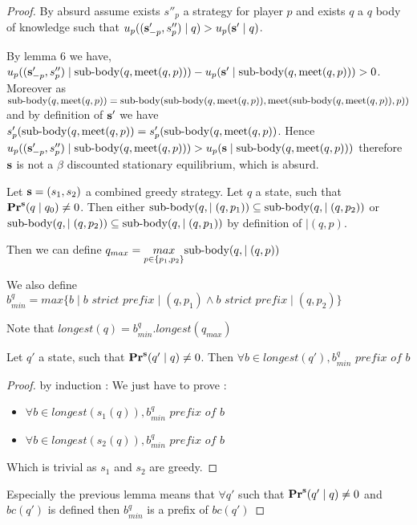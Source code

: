 \begin{proof}
By absurd assume exists $s''_p$ a strategy for player $p$ and exists $q$ a $q$ body of knowledge such that $u_p ((\mathbf{s}'_{-p},s''_p) \mid q) > u_p(\mathbf{s}' \mid q)$.

By lemma 6 we have, $u_p((\mathbf{s}'_{-p},s''_p) \mid {\text{\rm sub-body}}(q,\text{\rm meet}(q,p))) - u_p(\mathbf{s}' \mid {\text{\rm sub-body}}(q,\text{\rm meet}(q,p))) > 0$. 
Moreover as ${\text{\rm sub-body}}(q,\text{\rm meet}(q,p)) = {\text{\rm sub-body}}({\text{\rm sub-body}}(q,\text{\rm meet}(q,p)),\text{\rm meet}({\text{\rm sub-body}}(q,\text{\rm meet}(q,p)),p))$ and by definition of $\mathbf{s}'$ we have $s'_p({\text{\rm sub-body}}(q,\text{\rm meet}(q,p)) = s'_p({\text{\rm sub-body}}(q,\text{\rm meet}(q,p))$. Hence $u_p((\mathbf{s}'_{-p},s''_p) \mid {\text{\rm sub-body}}(q,\text{\rm meet}(q,p))) > u_p(\mathbf{s} \mid {\text{\rm sub-body}}(q,\text{\rm meet}(q,p)))$ therefore $\mathbf{s}$ is not a $\beta$ discounted stationary equilibrium, which is absurd.


	
\iffalse	
	Let $\mathbf{s} = (s_1,s_2)$ a combined greedy strategy. 
	Let $q$ a state, such that $\mathbf{Pr}^{\mathbf{s}}(q \mid q_0) \neq 0$. 
	Then either ${\text{\rm sub-body}}(q,\mid(q,p_1)) \subseteq {\text{\rm sub-body}}(q,\mid(q,p_2))$ or ${\text{\rm sub-body}}(q,\mid(q,p_2)) \subseteq {\text{\rm sub-body}}(q,\mid(q,p_1))$ by definition of $\mid(q,p)$.
	
	Then we  can define $q_{max} = \underset{p \in \{p_1,p_2\}}{max}{\text{\rm sub-body}}(q,\mid(q,p))$
	
	We also define $b^q_{min} = max\{b \mid b \textit{ strict prefix} \mid(q,p_1) \land b \textit{ strict prefix} \mid(q,p_2) \}$
	
	Note that $longest(q) = b^q_{min}.longest(q_{max})$
	
	\begin{mylem}
	Let $q'$ a state, such that $\mathbf{Pr}^{\mathbf{s}}(q' \mid q) \neq 0$. 
	Then  $\forall b \in longest(q'), b^q_{min} \textit{ prefix of } b$
	\end{mylem}
	\begin{proof}
		by induction : 
		We just have to prove : 
		\begin{itemize}
		\item $\forall b \in longest(s_1(q)), b^q_{min} \textit{ prefix of } b $
		\item $\forall b \in longest(s_2(q)), b^q_{min} \textit{ prefix of } b $
		\end{itemize}
	Which is trivial as $s_1$ and $s_2$ are greedy.
	\end{proof}

Especially the previous lemma means that $\forall q'$ such that $\mathbf{Pr}^{\mathbf{s}}(q' \mid q) \neq 0$ and $bc(q')$ is defined then $b^q_{min}$ is a prefix of $bc(q')$




\end{proof}
